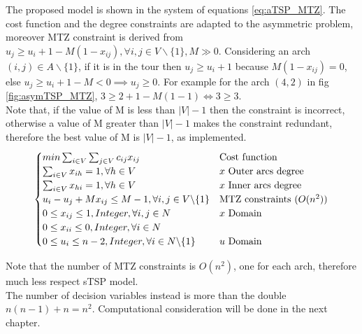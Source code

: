 The proposed model is shown in the system of equations \ref{eq:aTSP_MTZ}. The cost function and the degree constraints are adapted to the asymmetric problem, moreover MTZ constraint is derived from $ u_j \ge u_i+1-M(1-x_{ij}), \forall i,j \in V \backslash \{1\}, M \gg 0 $. Considering an arch $ (i,j) \in A \backslash \{1\} $, if it is in the tour then $ u_j \ge u_i + 1 $ because $ M(1-x_{ij}) = 0 $, else $ u_j \ge u_i + 1 - M < 0 \implies u_j \ge 0 $. For example for the arch $ (4,2) $ in fig \ref{fig:asymTSP_MTZ}, $ 3 \ge 2 + 1 - M(1-1) \iff 3 \ge 3 $. \\
Note that, if the value of M is less than $|V| - 1$  then the constraint is incorrect, otherwise a value of M greater than $|V| - 1 $ makes the constraint redundant, therefore the best value of M is $|V| - 1$, as implemented. \\
\begin{equation}
\begin{cases}
min \sum_{i\in V}\sum_{j\in V} c_{ij}x_{ij} & \text{Cost function} \\
\sum_{i\in V} x_{ih} = 1, \forall h \in V  & \text{$ x $ Outer arcs degree} \\
\sum_{i\in V} x_{hi} = 1, \forall h \in V  & \text{$ x $ Inner arcs degree} \\
u_i -u_j +M x_{ij} \le M - 1, \forall i,j \in V \backslash \{1\} & \text{MTZ constraints ($ O(n^2) $)} \\
0 \le x_{ij} \le 1, Integer, \forall i,j \in N  & \text{$ x $ Domain} \\
0 \le x_{ii} \le 0, Integer, \forall i \in N  & \text{} \\
0 \le u_{i} \le n-2, Integer, \forall i \in N \backslash \{1\} & \text{$ u $ Domain} 
\end{cases}
\label{eq:aTSP_MTZ}
\end{equation}


Note that the number of MTZ constraints is $ O(n^2) $, one for each arch, therefore much less respect sTSP model.\\
The number of decision variables instead is more than the double $ n(n-1) + n = n^2 $. Computational consideration will be done in the next chapter.

